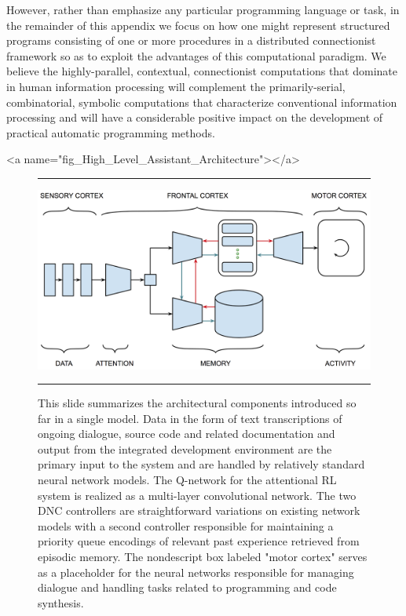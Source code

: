 However, rather than emphasize any particular programming language or task, in the remainder of this appendix we focus on how one might represent structured programs consisting of one or more procedures in a distributed connectionist framework so as to exploit the advantages of this computational paradigm. We believe the highly-parallel, contextual, connectionist computations that dominate in human information processing will complement the primarily-serial, combinatorial, symbolic computations that characterize conventional information processing and will have a considerable positive impact on the development of practical automatic programming methods.


\setcounter{figure}{52}


\rawhtml
<a name="fig_High_Level_Assistant_Architecture"></a>
\endrawhtml
\begin{figure}
%
  \hrule{}
%
  \begin{center} 
    \includegraphics[width=595pt]{./figures/High_Level_Assistant_Architecture.png} %
  \end{center}
%
  \caption{This slide summarizes the architectural components introduced so far in a single model. Data in the form of text transcriptions of ongoing dialogue, source code and related documentation and output from the integrated development environment are the primary input to the system and are handled by relatively standard neural network models. The Q-network for the attentional RL system is realized as a multi-layer convolutional network. The two DNC controllers are straightforward variations on existing network models with a second controller responsible for maintaining a priority queue encodings of relevant past experience retrieved from episodic memory. The nondescript box labeled "motor cortex" serves as a placeholder for the neural networks responsible for managing dialogue and handling tasks related to programming and code synthesis.}
%
  \hrule{}
%
\end{figure}

